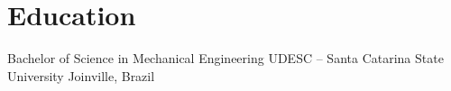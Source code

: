 
\section{Education}

  {Bachelor of Science in Mechanical Engineering}
  {UDESC -- Santa Catarina State University}
  {Joinville, Brazil}
  {}
  {}